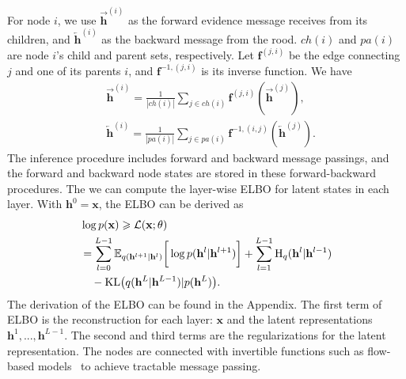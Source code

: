 \documentclass[conference]{IEEEtran}
\begin{document}
For node $i$, we use $\overrightarrow{\mathbf{h}}^{(i)}$ as the forward evidence message receives from its children, and $\overleftarrow{\mathbf{h}}^{(i)}$ as the  backward message from the rood. $ch(i)$ and $pa(i)$ are node $i$'s child and parent  sets, respectively.   Let $\mathbf{f}^{(j, i)}$ be the edge connecting $j$ and one of its parents $i$, and $\mathbf{f}^{-1, (j, i)}$ is its inverse function.  We have
\begin{align*}
&  \overrightarrow{\mathbf{h}}^{(i)} = \frac{1}{|ch(i)|} \sum_{j \in ch(i) } \mathbf{f}^{(j,i)}(\overrightarrow{\mathbf{h}}^{(j)}), \\ &\overleftarrow{\mathbf{h}}^{(i)} = \frac{1}{|pa(i)|} \sum_{j \in pa(i) } \mathbf{f}^{-1, (i,j)}(\overleftarrow{\mathbf{h}}^{(j)}) .
\end{align*} 
The inference procedure includes forward and backward message passings, and  the forward and backward node states are stored in these forward-backward procedures. The we can compute the layer-wise ELBO for latent states in each layer. %
With $\mathbf{h}^0 = \mathbf{x}$, the ELBO can be derived as 
\begin{align}  \notag
& \log p(\mathbf{x}) \geqslant \mathcal{L}(\mathbf{x}; \theta) \\
& =  \sum_{l=0}^{L-1}  \mathbb{E}_{q(\mathbf{h}^{l+1}|\mathbf{h}^l)} \bigg[ \log p( \mathbf{h}^{l}|  \mathbf{h}^{l+1})   \bigg] +  \sum_{l=1}^{L-1}   \text{H}_q(\mathbf{h}^l | \mathbf{h}^{l-1} ) \nonumber \\
& \quad  -   \text{KL}\big(q(\mathbf{h}^L | \mathbf{h}^{L-1} )   | p(\mathbf{h}^L)  \big) .  \label{eq:elbo}
 \end{align}
The derivation of the ELBO can be found in the Appendix. The first term of ELBO is the reconstruction for each layer: $\mathbf{x}$ and the latent representations $\mathbf{h}^1, ..., \mathbf{h}^{L-1}$. The second and third terms are the regularizations for the latent representation. The nodes are connected with invertible functions such as flow-based models~\cite{Dinh2016DensityEU} to achieve tractable message passing. 
\end{document}
